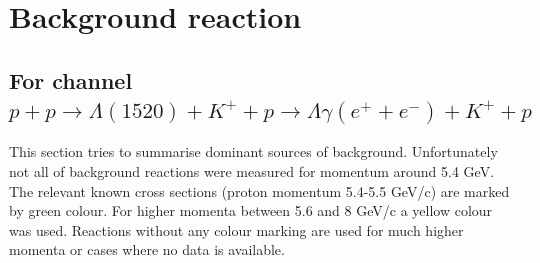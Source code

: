 \documentclass[12pt]{article}
\begin{document}
\newpage
\section{Background reaction}
\subsection{For channel $p+p\rightarrow\Lambda (1520) +K^+ +p\rightarrow \Lambda \gamma (e^{+} + e^{-})+K^+ +p$}

This section tries to summarise dominant sources of background. Unfortunately not all of background reactions were measured for momentum around 5.4 GeV. The relevant known cross sections (proton momentum 5.4-5.5 GeV/c) are marked by green colour. For higher momenta between 5.6 and 8 GeV/c a yellow colour was used. Reactions without any colour marking are used for much higher momenta or cases where no data is available.
\end{document}
